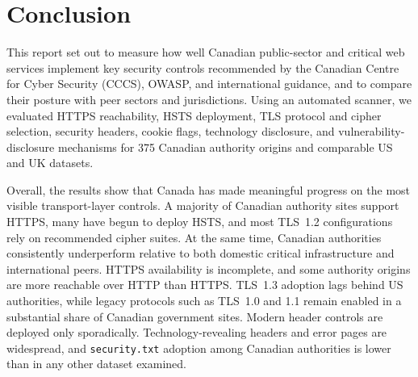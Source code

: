 \documentclass[pdflatex,sn-mathphys-num]{sn-jnl}
\numberwithin{equation}{section}
\theoremstyle{thmstyleone}
\theoremstyle{thmstyletwo}%
\theoremstyle{thmstylethree}%
\begin{document}



\section{Conclusion}

This report set out to measure how well Canadian public-sector and critical web services implement key security 
controls recommended by the Canadian Centre for Cyber Security (CCCS), OWASP, and international guidance, and 
to compare their posture with peer sectors and jurisdictions. Using an automated scanner, we evaluated HTTPS 
reachability, HSTS deployment, TLS protocol and cipher selection, security headers, cookie flags, technology 
disclosure, and vulnerability-disclosure mechanisms for 375 Canadian authority origins and comparable US and UK 
datasets.

\vspace{1em}Overall, the results show that Canada has made meaningful progress on the most visible transport-layer 
controls. A majority of Canadian authority sites support HTTPS, many have begun to deploy HSTS, and most 
TLS~1.2 configurations rely on recommended cipher suites. At the same time, Canadian authorities consistently 
underperform relative to both domestic critical 
infrastructure and international peers. HTTPS availability is incomplete, and some authority origins are more 
reachable over HTTP than HTTPS. TLS~1.3 adoption lags behind US authorities, while legacy protocols such as 
TLS~1.0 and 1.1 remain enabled in a substantial share of Canadian government sites. Modern header 
controls are deployed only sporadically. Technology-revealing headers and error 
pages are widespread, and \texttt{security.txt} adoption among Canadian authorities is lower than in any other 
dataset examined.
\end{document}

